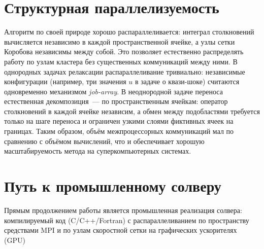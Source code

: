\section{Структурная параллелизуемость}

Алгоритм по своей природе хорошо распараллеливается: интеграл столкновений вычисляется независимо в каждой
пространственной ячейке, а узлы сетки Коробова независимы между собой.
Это позволяет естественно распределять работу по узлам кластера без существенных коммуникаций между ними.
В однородных задачах релаксации распараллеливание тривиально: независимые конфигурации (например, три значения $u$ в
задаче о квази-шоке) считаются одновременно механизмом \emph{job-array}.
В неоднородной задаче переноса естественная декомпозиция~--- по пространственным ячейкам: оператор столкновений в каждой
ячейке независим, а обмен между подобластями требуется только на шаге переноса и ограничен узкими слоями фиктивных ячеек
на границах.
Таким образом, объём межпроцессорных коммуникаций мал по сравнению с объёмом вычислений, что и обеспечивает хорошую
масштабируемость метода на суперкомпьютерных системах.

\section{Путь к промышленному солверу}
\label{sec:hpcpath}

Прямым продолжением работы является промышленная реализация солвера: компилируемый код (C/C++/Fortran) с
распараллеливанием по пространству средствами MPI и по узлам скоростной сетки на графических ускорителях (GPU)
